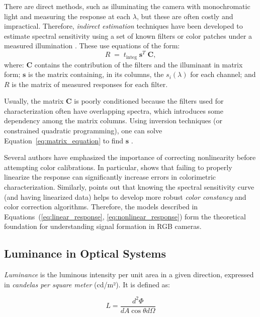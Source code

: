 There are direct methods, such as illuminating the camera with monochromatic light and measuring the response at each $\lambda$, but these are often costly and impractical. Therefore, \emph{indirect estimation} techniques have been developed to estimate spectral sensitivity using a set of known filters or color patches under a measured illumination \cite{Uttner2006SpectralCameras}. These use equations of the form:
\begin{equation}
R \;=\; t_{\mathrm{integ}} \;\mathbf{s}^{T}\;\mathbf{C},
\label{eq:matrix_equation}
\end{equation}
where: $\mathbf{C}$ contains the contribution of the filters and the illuminant in matrix form; $\mathbf{s}$ is the matrix containing, in its columns, the $s_{i}(\lambda)$ for each channel; and $R$ is the matrix of measured responses for each filter.

Usually, the matrix $\mathbf{C}$ is poorly conditioned because the filters used for characterization often have overlapping spectra, which introduces some dependency among the matrix columns. Using inversion techniques (or constrained quadratic programming), one can solve Equation~\eqref{eq:matrix_equation} to find $\mathbf{s}$ \cite{Uttner2006SpectralCameras}.

Several authors have emphasized the importance of correcting nonlinearity before attempting color calibrations. In particular, \cite{Cheung2004AccurateCameras} shows that failing to properly linearize the response can significantly increase errors in colorimetric characterization. Similarly, \cite{Uttner2006SpectralCameras} points out that knowing the spectral sensitivity curve (and having linearized data) helps to develop more robust \emph{color constancy} and color correction algorithms. Therefore, the models described in Equations~(\ref{eq:linear_response}, \ref{eq:nonlinear_response}) form the theoretical foundation for understanding signal formation in RGB cameras.

\subsection{Luminance in Optical Systems}

\textit{Luminance} is the luminous intensity per unit area in a given direction, expressed in \textit{candelas per square meter} (cd/m²). It is defined as:

\begin{equation}
L = \frac{d^2\Phi}{dA \cos\theta d\Omega}
\end{equation}

